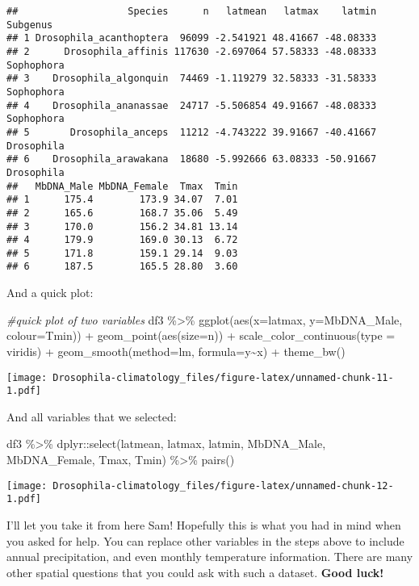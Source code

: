 \documentclass[
]{article}
\newenvironment{Shaded}{\begin{snugshade}}{\end{snugshade}}
\newcommand{\AttributeTok}[1]{\textcolor[rgb]{0.77,0.63,0.00}{#1}}
\newcommand{\CommentTok}[1]{\textcolor[rgb]{0.56,0.35,0.01}{\textit{#1}}}
\newcommand{\FunctionTok}[1]{\textcolor[rgb]{0.00,0.00,0.00}{#1}}
\newcommand{\NormalTok}[1]{#1}
\newcommand{\SpecialCharTok}[1]{\textcolor[rgb]{0.00,0.00,0.00}{#1}}
\newcommand{\StringTok}[1]{\textcolor[rgb]{0.31,0.60,0.02}{#1}}
\begin{document}
\begin{verbatim}
##                   Species      n   latmean   latmax    latmin   Subgenus
## 1 Drosophila_acanthoptera  96099 -2.541921 48.41667 -48.08333           
## 2      Drosophila_affinis 117630 -2.697064 57.58333 -48.08333 Sophophora
## 3    Drosophila_algonquin  74469 -1.119279 32.58333 -31.58333 Sophophora
## 4    Drosophila_ananassae  24717 -5.506854 49.91667 -48.08333 Sophophora
## 5       Drosophila_anceps  11212 -4.743222 39.91667 -40.41667 Drosophila
## 6    Drosophila_arawakana  18680 -5.992666 63.08333 -50.91667 Drosophila
##   MbDNA_Male MbDNA_Female  Tmax  Tmin
## 1      175.4        173.9 34.07  7.01
## 2      165.6        168.7 35.06  5.49
## 3      170.0        156.2 34.81 13.14
## 4      179.9        169.0 30.13  6.72
## 5      171.8        159.1 29.14  9.03
## 6      187.5        165.5 28.80  3.60
\end{verbatim}

And a quick plot:

\begin{Shaded}
\begin{Highlighting}[]
\CommentTok{\#quick plot of two variables}
\NormalTok{df3 }\SpecialCharTok{\%\textgreater{}\%}
  \FunctionTok{ggplot}\NormalTok{(}\FunctionTok{aes}\NormalTok{(}\AttributeTok{x=}\NormalTok{latmax, }\AttributeTok{y=}\NormalTok{MbDNA\_Male, }\AttributeTok{colour=}\NormalTok{Tmin)) }\SpecialCharTok{+} 
  \FunctionTok{geom\_point}\NormalTok{(}\FunctionTok{aes}\NormalTok{(}\AttributeTok{size=}\NormalTok{n)) }\SpecialCharTok{+} \FunctionTok{scale\_color\_continuous}\NormalTok{(}\AttributeTok{type =} \StringTok{\textquotesingle{}viridis\textquotesingle{}}\NormalTok{) }\SpecialCharTok{+} 
  \FunctionTok{geom\_smooth}\NormalTok{(}\AttributeTok{method=}\StringTok{\textquotesingle{}lm\textquotesingle{}}\NormalTok{, }\AttributeTok{formula=}\StringTok{\textquotesingle{}y\textasciitilde{}x\textquotesingle{}}\NormalTok{) }\SpecialCharTok{+} \FunctionTok{theme\_bw}\NormalTok{()}
\end{Highlighting}
\end{Shaded}

\texttt{[image: Drosophila-climatology\_files/figure-latex/unnamed-chunk-11-1.pdf]}

And all variables that we selected:

\begin{Shaded}
\begin{Highlighting}[]
\NormalTok{df3 }\SpecialCharTok{\%\textgreater{}\%}\NormalTok{ dplyr}\SpecialCharTok{::}\FunctionTok{select}\NormalTok{(latmean, latmax, latmin, MbDNA\_Male, MbDNA\_Female, Tmax, Tmin) }\SpecialCharTok{\%\textgreater{}\%} \FunctionTok{pairs}\NormalTok{()}
\end{Highlighting}
\end{Shaded}

\texttt{[image: Drosophila-climatology\_files/figure-latex/unnamed-chunk-12-1.pdf]}

I'll let you take it from here Sam! Hopefully this is what you had in
mind when you asked for help. You can replace other variables in the
steps above to include annual precipitation, and even monthly
temperature information. There are many other spatial questions that you
could ask with such a dataset. \textbf{Good luck!}
\end{document}
